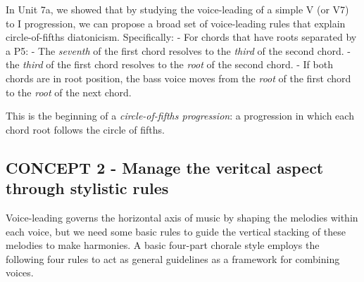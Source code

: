 \documentclass{book}
\begin{document}
In Unit 7a, we showed that by studying the voice-leading of a simple V (or V7)
to I progression, we can propose a broad set of voice-leading rules that
explain circle-of-fifths diatonicism. Specifically: - For chords that have
roots separated by a P5: - The \emph{seventh} of the first chord resolves to
the \emph{third} of the second chord. - the \emph{third} of the first chord
resolves to the \emph{root} of the second chord. - If both chords are in root
position, the bass voice moves from the \emph{root} of the first chord to the
\emph{root} of the next chord.

This is the beginning of a \emph{circle-of-fifths progression}: a progression
in which each chord root follows the circle of fifths.

\hypertarget{concept-2---manage-the-veritcal-aspect-through-stylistic-rules}{%
\subsection{CONCEPT 2 - Manage the veritcal aspect through stylistic
rules}\label{concept-2---manage-the-veritcal-aspect-through-stylistic-rules}}

Voice-leading governs the horizontal axis of music by shaping the melodies
within each voice, but we need some basic rules to guide the vertical stacking
of these melodies to make harmonies. A basic four-part chorale style employs
the following four rules to act as general guidelines as a framework for
combining voices.
\end{document}
